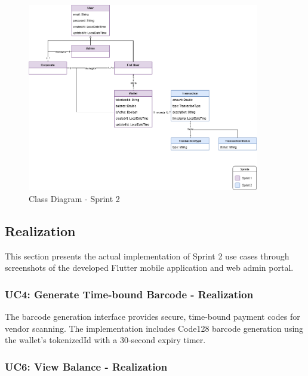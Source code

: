 \begin{figure}[H]
\centering
\includegraphics[width=0.9\textwidth]{images/class_sprint2.png}
\caption{Class Diagram - Sprint 2}
\label{fig:class_sprint2}
\end{figure}

\subsection{Realization}

This section presents the actual implementation of Sprint 2 use cases through screenshots of the developed Flutter mobile application and web admin portal.

\subsubsection{UC4: Generate Time-bound Barcode - Realization}

The barcode generation interface provides secure, time-bound payment codes for vendor scanning. The implementation includes Code128 barcode generation using the wallet's tokenizedId with a 30-second expiry timer.


\subsubsection{UC6: View Balance - Realization}

